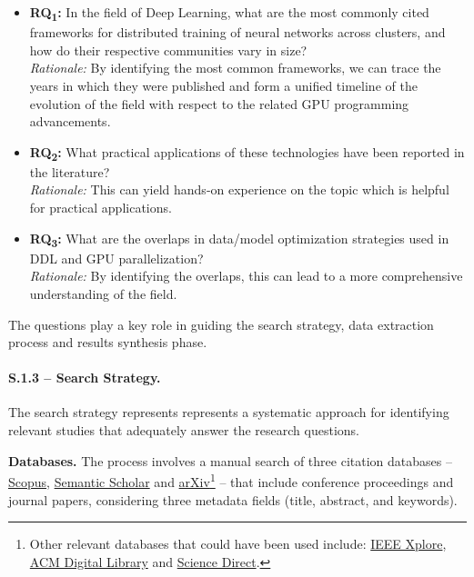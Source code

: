 \label{sec:research_questions_refined}
\begin{itemize}
	\item \textbf{RQ\textsubscript{1}:} In the field of Deep Learning, what are the most commonly cited
	      frameworks for distributed training of neural networks across clusters, and how do their respective communities vary in size? \\
	      \textit{Rationale:} By identifying the most common frameworks, we can trace the years in which they were published
	      and form a unified timeline of the evolution of the field with respect to the related GPU programming advancements.

	\item \textbf{RQ\textsubscript{2}:} What practical applications of these technologies have been reported in the literature? \\
	      \textit{Rationale:} This can yield hands-on experience on the topic which is helpful for practical applications.

	\item \textbf{RQ\textsubscript{3}:} What are the overlaps in data/model optimization strategies used in DDL and GPU parallelization? \\
	      \textit{Rationale:} By identifying the overlaps, this can lead to a more comprehensive understanding of the field.
\end{itemize}


The questions play a key role in guiding the search strategy, data extraction process and results
synthesis phase.

\paragraph{S.1.3 -- Search Strategy.}
The search strategy represents represents a systematic approach for identifying relevant studies
that adequately answer the research questions.

\textbf{Databases.}
The process involves a manual search of three citation databases --
\href{https://www.scopus.com/}{Scopus}, \href{https://www.semanticscholar.org/}{Semantic Scholar}
and \href{https://arxiv.org/}{arXiv}\footnote{Other relevant databases that could have been used
	include: \href{https://ieeexplore.ieee.org/}{IEEE Xplore}, \href{https://dl.acm.org/}{ACM Digital
		Library} and \href{https://www.sciencedirect.com/}{Science Direct}.} -- that include conference
proceedings and journal papers, considering three metadata fields (title, abstract, and keywords).

